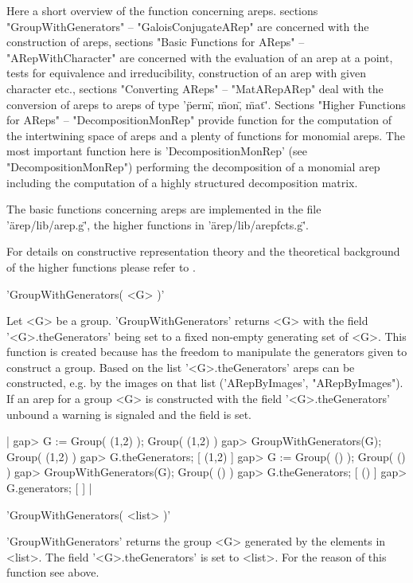 Here a short overview of the function concerning areps.
sections "GroupWithGenerators" -- "GaloisConjugateARep" are 
concerned with the construction of areps, sections 
"Basic Functions for AReps" -- "ARepWithCharacter" are
concerned with the evaluation of an arep at a point, tests for
equivalence and irreducibility, construction of an arep
with given character etc., sections "Converting AReps" --
"MatARepARep" deal with the conversion of areps to areps 
of type '\"perm\", \"mon\", \"mat\"'. 
Sections "Higher Functions for AReps" -- "DecompositionMonRep"
provide function for the computation of the intertwining space
of areps and a plenty of functions for monomial areps. The
most important function here is 'DecompositionMonRep'
(see "DecompositionMonRep") performing the decomposition of 
a monomial arep including the computation of a highly
structured decomposition matrix. 

The basic functions concerning areps are implemented in the file
'\"arep/lib/arep.g\"', the higher functions in
'\"arep/lib/arepfcts.g\"'.

For details on constructive representation theory and the theoretical
background of the higher functions please refer to \cite{Pue98}.


'GroupWithGenerators( <G> )'

Let <G> be a group. 'GroupWithGenerators' returns <G> with the 
field '<G>.theGenerators' being set to a fixed non-empty generating
set of <G>. This function is created because {\GAP} has the freedom 
to manipulate the generators given to construct a group.
Based on the list '<G>.theGenerators' areps can be 
constructed, e.g. by the images on that list 
('ARepByImages', "ARepByImages"). If an arep for a group <G> 
is constructed with the field '<G>.theGenerators' unbound a
warning is signaled and the field is set.

|    gap> G := Group( (1,2) );
    Group( (1,2) )
    gap> GroupWithGenerators(G);
    Group( (1,2) )
    gap> G.theGenerators;
    [ (1,2) ]
    gap> G := Group( () );
    Group( () )
    gap> GroupWithGenerators(G);
    Group( () )
    gap> G.theGenerators;
    [ () ]
    gap> G.generators;
    [  ] |

'GroupWithGenerators( <list> )'

'GroupWithGenerators' returns the group <G> generated by the elements
in <list>. The field '<G>.theGenerators' is set to <list>. 
For the reason of this function see above.

